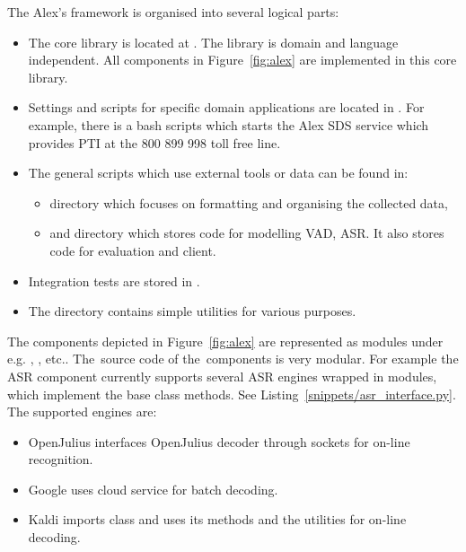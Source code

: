 The Alex's framework is organised into several logical parts:
\begin{itemize}
    \item The core library is located at . The library is domain and language independent. All components in Figure~\ref{fig:alex} are implemented in this core library.
    \item Settings and scripts for specific domain applications are located in .
        For example, there is a bash scripts  which starts the Alex \ac{SDS} service which provides \acl{PTI} at the 800 899 998 toll free line.
    \item The general scripts which use external tools or data can be found in:
        \begin{itemize}
            \item {} directory which focuses on formatting and organising the collected data,
            \item and \term {} directory which stores code for modelling \ac{VAD}, \ac{ASR}. It also stores code for evaluation and  client.
        \end{itemize}
    \item Integration tests are stored in .
    \item The  directory contains simple utilities for various purposes.
\end{itemize}

The components depicted in Figure~\ref{fig:alex} are represented as 
modules under  e.g. ,  , etc..
The~source code of the~components is very modular.
For example the \ac{ASR} component currently supports several \ac{ASR} engines wrapped in modules, which implement the base class  methods. 
See Listing~\ref{snippets/asr_interface.py}.
The supported engines are:
\begin{itemize}
    \item OpenJulius  interfaces OpenJulius decoder through sockets for on-line recognition.
    \item Google  uses cloud service for batch decoding.
    \item Kaldi  imports  class and uses its methods and the utilities for on-line decoding.
\end{itemize}


